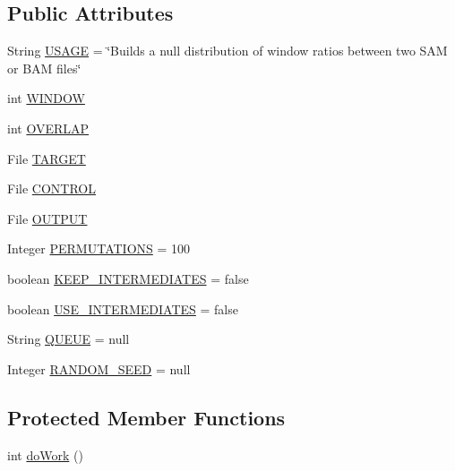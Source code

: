 \subsection*{Public Attributes}
\begin{DoxyCompactItemize}
\item 
String \hyperlink{classbroad_1_1pda_1_1seq_1_1rap_1_1_build_ratio_null_distribution_a0d49d0dea14e4a1738e3fd4e8a363f1c}{U\+S\+A\+G\+E} = \char`\"{}Builds a null distribution of window ratios between two S\+A\+M or B\+A\+M files\char`\"{}
\item 
int \hyperlink{classbroad_1_1pda_1_1seq_1_1rap_1_1_build_ratio_null_distribution_a48fd3b10fc361eb5fb5b903b53a2fba1}{W\+I\+N\+D\+O\+W}
\item 
int \hyperlink{classbroad_1_1pda_1_1seq_1_1rap_1_1_build_ratio_null_distribution_a7ea783589a93e5680f4228965fb7ed5e}{O\+V\+E\+R\+L\+A\+P}
\item 
File \hyperlink{classbroad_1_1pda_1_1seq_1_1rap_1_1_build_ratio_null_distribution_afc7ab7f258f1e8343a1dfd87177671be}{T\+A\+R\+G\+E\+T}
\item 
File \hyperlink{classbroad_1_1pda_1_1seq_1_1rap_1_1_build_ratio_null_distribution_a774eb640de6c6b27ffbff3ebaf9040d1}{C\+O\+N\+T\+R\+O\+L}
\item 
File \hyperlink{classbroad_1_1pda_1_1seq_1_1rap_1_1_build_ratio_null_distribution_a4aeee8e3a8c764b362abad3d96f91e73}{O\+U\+T\+P\+U\+T}
\item 
Integer \hyperlink{classbroad_1_1pda_1_1seq_1_1rap_1_1_build_ratio_null_distribution_a9aff0d9ef3cb6c18e094400abba849a8}{P\+E\+R\+M\+U\+T\+A\+T\+I\+O\+N\+S} = 100
\item 
boolean \hyperlink{classbroad_1_1pda_1_1seq_1_1rap_1_1_build_ratio_null_distribution_aecc7243b83306552b0b30f393c58767f}{K\+E\+E\+P\+\_\+\+I\+N\+T\+E\+R\+M\+E\+D\+I\+A\+T\+E\+S} = false
\item 
boolean \hyperlink{classbroad_1_1pda_1_1seq_1_1rap_1_1_build_ratio_null_distribution_a6ea0b8932123923712855a17a0f35d8f}{U\+S\+E\+\_\+\+I\+N\+T\+E\+R\+M\+E\+D\+I\+A\+T\+E\+S} = false
\item 
String \hyperlink{classbroad_1_1pda_1_1seq_1_1rap_1_1_build_ratio_null_distribution_a8c5ad069fa85f83b74f7fee03d025d82}{Q\+U\+E\+U\+E} = null
\item 
Integer \hyperlink{classbroad_1_1pda_1_1seq_1_1rap_1_1_build_ratio_null_distribution_a2138e5754a171254134be7dd29a071d5}{R\+A\+N\+D\+O\+M\+\_\+\+S\+E\+E\+D} = null
\end{DoxyCompactItemize}
\subsection*{Protected Member Functions}
\begin{DoxyCompactItemize}
\item 
int \hyperlink{classbroad_1_1pda_1_1seq_1_1rap_1_1_build_ratio_null_distribution_af76df0b195b5d38470767a21fa84c465}{do\+Work} ()
\end{DoxyCompactItemize}
